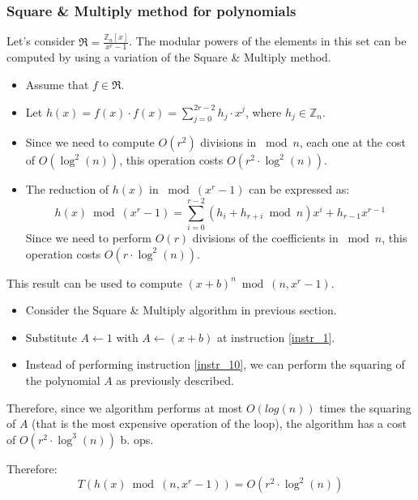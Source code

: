 \subsubsection{Square \& Multiply method for polynomials}
Let's consider $\Re = \frac{\mathbb{Z}_{n}[x]}{x^{r} - 1}$. The modular powers of the elements in this set can be computed by using a variation of the Square \& Multiply method.
\begin{itemize}
    \item Assume that $f\in \Re$.
    \item Let $h(x) = f(x) \cdot f(x) = \sum_{j = 0}^{2r - 2} h_{j} \cdot x^{j}$, where $h_{j} \in \mathbb{Z}_{n}$.
    \item Since we need to compute $O(r^2)$ divisions in $\bmod n$, each one at the cost of $O(\operatorname{log}^{2}(n))$, this operation costs $O(r^2 \cdot \operatorname{log}^{2}(n))$.
    \item The reduction of $h(x)$ in $\bmod (x^r - 1)$ can be expressed as:
    \[h(x) \bmod (x^r - 1) = \sum_{i=0}^{r-2} (h_{i} + h_{r+i} \bmod n)x^i + h_{r-1}x^{r-1}\]
    Since we need to perform $O(r)$ divisions of the coefficients in $\bmod n$, this operation costs $O(r \cdot \operatorname{log}^{2}(n))$.
\end{itemize}
This result can be used to compute $(x + b)^n \bmod (n, x^r - 1)$.
\begin{itemize}
    \item Consider the Square \& Multiply algorithm in previous section.
    \item Substitute $A \gets 1$ with $A \gets (x + b)$ at instruction \ref{instr_1}.
    \item Instead of performing instruction \ref{instr_10}, we can perform the squaring of the polynomial $A$ as previously described.
\end{itemize}
Therefore, since we algorithm performs at most $O(log(n))$ times the squaring of $A$ (that is the most expensive operation of the loop), the algorithm has a cost of $O(r^2 \cdot \operatorname{log}^{3}(n))$ b. ops.

Therefore: \[T(h(x) \bmod (n, x^{r} - 1)) = O(r^{2} \cdot \operatorname{log}^{2}(n))\]

